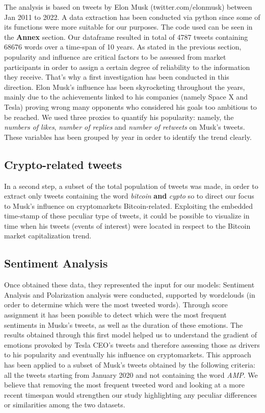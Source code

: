 \documentclass[
]{article}
\begin{document}
The analysis is based on tweets by Elon Musk (twitter.com/elonmusk)
between Jan 2011 to 2022. A data extraction has been conducted via
python since some of its functions were more suitable for our purposes.
The code used can be seen in the \textbf{Annex} section. Our dataframe
resulted in total of 4787 tweets containing 68676 words over a time-span
of 10 years. As stated in the previous section, popularity and influence
are critical factors to be assessed from market participants in order to
assign a certain degree of reliability to the information they receive.
That's why a first investigation has been conducted in this direction.
Elon Musk's influence has been skyrocketing throughout the years, mainly
due to the achievements linked to his companies (namely Space X and
Tesla) proving wrong many opponents who considered his goals too
ambitious to be reached. We used three proxies to quantify his
popularity: namely, the \emph{numbers of likes}, \emph{number of
replies} and \emph{number of retweets} on Musk's tweets. These variables
has been grouped by year in order to identify the trend clearly.

\hypertarget{crypto-related-tweets}{%
\subsection{Crypto-related tweets}\label{crypto-related-tweets}}

In a second step, a subset of the total population of tweets was made,
in order to extract only tweets containing the word \emph{bitcoin}
\textbf{and} \emph{cypto} so to direct our focus to Musk's influence on
cryptomarkets Bitcoin-related. Exploiting the embedded time-stamp of
these peculiar type of tweets, it could be possible to visualize in time
when his tweets (events of interest) were located in respect to the
Bitcoin market capitalization trend.

\hypertarget{sentiment-analysis-1}{%
\subsection{Sentiment Analysis}\label{sentiment-analysis-1}}

Once obtained these data, they represented the input for our models:
Sentiment Analysis and Polarization analysis were conducted, supported
by wordclouds (in order to determine which were the most tweeted words).
Through score assignment it has been possible to detect which were the
most frequent sentiments in Musks's tweets, as well as the duration of
these emotions. The results obtained through this first model helped us
to understand the gradient of emotions provoked by Tesla CEO's tweets
and therefore assessing those as drivers to his popularity and
eventually his influence on cryptomarkets. This approach has been
applied to a subset of Musk's tweets obtained by the following criteria:
all the tweets starting from January 2020 and not containing the word
\emph{AMP}. We believe that removing the most frequent tweeted word and
looking at a more recent timespan would strengthen our study
highlighting any peculiar differences or similarities among the two
datasets.
\end{document}
